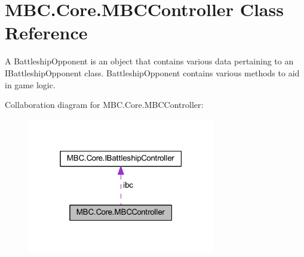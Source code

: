 \hypertarget{class_m_b_c_1_1_core_1_1_m_b_c_controller}{\section{M\-B\-C.\-Core.\-M\-B\-C\-Controller Class Reference}
\label{class_m_b_c_1_1_core_1_1_m_b_c_controller}
}


A Battleship\-Opponent is an object that contains various data pertaining to an I\-Battleship\-Opponent class. Battleship\-Opponent contains various methods to aid in game logic. 




Collaboration diagram for M\-B\-C.\-Core.\-M\-B\-C\-Controller\-:\nopagebreak
\begin{figure}[H]
\begin{center}
\leavevmode
\includegraphics[width=232pt]{class_m_b_c_1_1_core_1_1_m_b_c_controller__coll__graph}
\end{center}
\end{figure}
